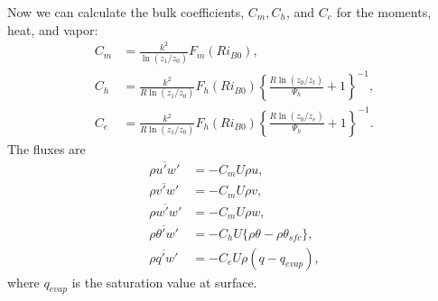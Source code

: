 Now we can calculate the bulk coefficients, $C_m, C_h$, and $C_e$ for the moments, heat, and vapor:
\begin{align}
  C_m &= \frac{k^2}{\ln(z_1/z_0)}F_m(Ri_{B0}), \\
  C_h &= \frac{k^2}{R\ln(z_1/z_0)}F_h(Ri_{B0})\left\{\frac{R\ln(z_0/z_t)}{\Psi_h}+1\right\}^{-1}, \\
  C_e &= \frac{k^2}{R\ln(z_1/z_0)}F_h(Ri_{B0})\left\{\frac{R\ln(z_0/z_e)}{\Psi_h}+1\right\}^{-1}.
\end{align}
The fluxes are
\begin{align}
  \overline{\rho u'w'} &= - C_m U \rho u, \\
  \overline{\rho v'w'} &= - C_m U \rho v, \\
  \overline{\rho w'w'} &= - C_m U \rho w, \\
  \overline{\rho \theta'w'} &= - C_h U \{\rho \theta - \rho \theta_{sfc}\}, \\
  \overline{\rho q'w'} &= -C_e U \rho ( q - q_{evap} ),
\end{align}
where $q_{evap}$ is the saturation value at surface.

